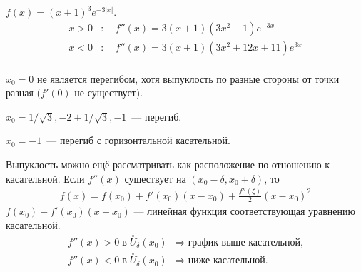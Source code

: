\begin{example}
\(f(x) = (x + 1)^3e^{-3|x|}\).
\begin{align}
    x > 0&: \quad f''(x) = 3(x + 1)(3x^2 - 1)e^{-3x}\\
    x < 0&: \quad f''(x) = 3(x + 1)(3x^2 + 12x + 11)e^{3x}\\
\end{align}

\begin{center}
\end{center}

\(x_0 = 0\) не является перегибом, хотя выпуклость по разные стороны от точки разная (\(f'(0)\) не
существует).

\(x_0 = 1/\sqrt{3}, -2 \pm 1/\sqrt{3}, -1\)~--- перегиб.

\(x_0 = -1\)~--- перегиб с горизонтальной касательной.
\end{example}

\begin{note}
Выпуклость можно ещё рассматривать как расположение по отношению к касательной.
Если \(f''(x)\) существует на \((x_0 - \delta, x_0 + \delta)\), то
\begin{gather}
    f(x) = f(x_0) + f'(x_0)(x - x_0) + \frac{f''(\xi)}{2}(x - x_0)^2
\end{gather}
\(f(x_0) + f'(x_0)(x - x_0)\) --- линейная функция соответствующая уравнению касательной.
\begin{align}
    f''(x) > 0 \; \text{в} \; \overset{\circ}{U}_{\delta}(x_0) &\Rightarrow \; \text{график выше
        касательной,}\\
    f''(x) < 0 \; \text{в} \; \overset{\circ}{U}_{\delta}(x_0) &\Rightarrow \; \text{ниже
        касательной.}
\end{align}
\end{note}
